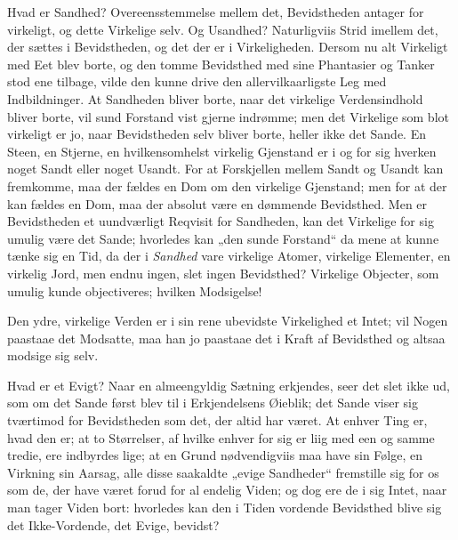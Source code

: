 \documentclass[12pt]{book}
\newcommand{\opage}[1]{\marginnote{\footnotesize\textit{[#1]}}}
\begin{document}
Hvad er Sandhed? Overeensstemmelse mellem det, Bevidstheden antager for virkeligt, og
dette Virkelige selv. Og Usandhed? Naturligviis Strid imellem det, der sættes i
Bevidstheden, og det der er i Virkeligheden. Dersom nu alt Virkeligt med Eet blev
borte, og den tomme Bevidsthed med sine Phantasier og Tanker stod ene tilbage, vilde
den kunne drive den allervilkaarligste Leg med Indbildninger. At Sandheden bliver
borte, naar det virkelige Verdensindhold bliver borte, vil sund Forstand vist gjerne
indrømme; men det Virkelige som blot virkeligt er jo, naar Bevidstheden selv bliver
borte, heller ikke det Sande. En Steen, en Stjerne, en hvilkensomhelst virkelig
Gjenstand er i og for sig hverken noget Sandt eller noget Usandt. For at Forskjellen
mellem Sandt og Usandt kan fremkomme, maa der fældes en Dom om den virkelige
Gjenstand; men for at der kan fældes en Dom, maa der absolut være en dømmende
Bevidsthed. Men er Bevidstheden et uundværligt Reqvisit for Sandheden, kan det
Virkelige for sig umulig være det Sande; hvorledes kan „den sunde Forstand“ da mene
at kunne tænke sig en Tid, da der i \emph{Sandhed} vare virkelige Atomer, virkelige
Elementer, en virkelig Jord, men endnu
\opage{43} ingen, slet ingen Bevidsthed? Virkelige Objecter, som umulig kunde objectiveres;
hvilken Modsigelse!

Den ydre, virkelige Verden er i sin rene ubevidste Virkelighed et Intet; vil Nogen
paastaae det Modsatte, maa han jo paastaae det i Kraft af Bevidsthed og altsaa modsige
sig selv.

Hvad er et Evigt? Naar en almeengyldig Sætning erkjendes, seer det slet ikke ud, som
om det Sande først blev til i Erkjendelsens Øieblik; det Sande viser sig tværtimod for
Bevidstheden som det, der altid har været. At enhver Ting er, hvad den er; at to
Størrelser, af hvilke enhver for sig er liig med een og samme tredie, ere indbyrdes
lige; at en Grund nødvendigviis maa have sin Følge, en Virkning sin Aarsag, alle disse
saakaldte „evige Sandheder“ fremstille sig for os som de, der have været forud for al
endelig Viden; og dog ere de i sig Intet, naar man tager Viden bort: hvorledes kan
den i Tiden vordende Bevidsthed blive sig det Ikke-Vordende, det Evige, bevidst?
\end{document}
